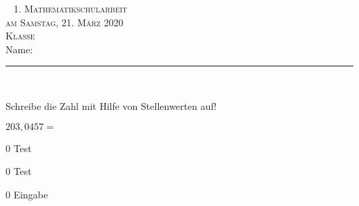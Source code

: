 \documentclass[a4paper,12pt]{report}
\begin{document}
\begin{titlepage}
\flushright
~\vfil 
\textsc{\Huge 1. Mathematikschularbeit} \\ 
[2cm] 
\textsc{\Large am Samstag, 21. März 2020}\\ [1cm] 
\textsc{\Large Klasse } \\ [1cm] 
\Large Name: \rule{8cm}{0.4pt} \\ 
\vfil\vfil\vfil 
\end{titlepage}

\begin{beispiel}{0}
				Schreibe die Zahl mit Hilfe von Stellenwerten auf!\leer
					
					$203,0457=$ 

\end{beispiel}

\begin{langesbeispiel} \item[0]
Test

\end{langesbeispiel}

\begin{langesbeispiel} \item[0]
Test

\end{langesbeispiel}

\begin{langesbeispiel} \item[0]
Eingabe

\end{langesbeispiel}



\end{document}
